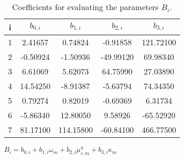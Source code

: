 \begin{table}
	\centering
	\caption{Coefficients for evaluating the parameters $B_i$.}\label{Bi_table}
	\begin{threeparttable}
		\begin{tabular*}{0.8\textwidth}{c|cccc}
			\toprule
			i     & $b_{0,i}$        & $b_{1,i}$         & $b_{2,i}$       & $b_{3,i}$   \\
			\midrule
			1     & 2.41657          & 0.74824           & -0.91858        & 121.72100   \\
			2     & -0.50924         & -1.50936          & -49.99120       & 69.98340    \\
			3     & 6.61069          & 5.62073           & 64.75990        & 27.03890    \\
			4     & 14.54250         & -8.91387          & -5.63794        & 74.34350    \\
			5     & 0.79274          & 0.82019           & -0.69369        & 6.31734     \\
			6     & -5.86340         & 12.80050          & 9.58926         & -65.52920   \\
			7     & 81.17100         & 114.15800         & -60.84100       & 466.77500   \\
			\bottomrule
		\end{tabular*}
		\begin{tablenotes}
			\footnotesize
			\item $B_{i} = b_{0,i} + b_{1,i}\omega_m + b_{2,i} \mu_{r,m}^4 + b_{3,i} \kappa_m$\\
		\end{tablenotes}
	\end{threeparttable}
\end{table}


